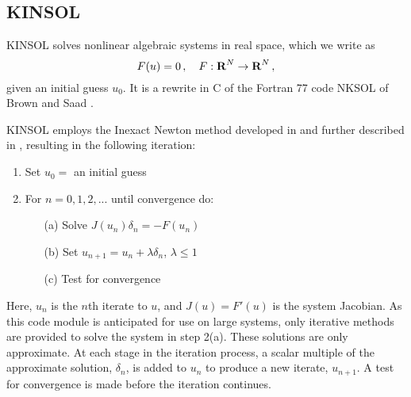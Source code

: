 \subsection{KINSOL}\label{ss:kinsol}

KINSOL solves nonlinear algebraic systems in real space, which we write as
\begin{equation}\label{nonlinear_system}
  F(u) = 0 \, , \quad F:\mbox{\bf R}^N \rightarrow \mbox{\bf R}^N \, ,
\end{equation}
given an initial guess $u_0$.  It is a rewrite in C of the Fortran 77
code NKSOL of Brown and Saad \cite{BrSa:90}.

KINSOL employs the Inexact Newton method developed in
\cite{BrSa:90,Bro:87,DES:82}
and further described in \cite{DeSc:96,Kel:95},
resulting in the following iteration:

\vspace{1ex}
\begin{enumerate}
   \item Set $u_0 = $ an initial guess
   \item For $n = 0, 1, 2,...$ until convergence do:
      \begin{itemize}
          \item[(a)] Solve $J(u_n)\delta_n = - F(u_n)$
          \item[(b)] Set $u_{n+1} = u_n + \lambda \delta_n$,
          $\lambda \leq 1$
          \item[(c)] Test for convergence
      \end{itemize}
\end{enumerate}
Here, $u_n$ is the $n$th iterate to $u$, and $J(u) = F'(u)$ is the
system Jacobian. As this code module is anticipated for use on
large systems, only iterative methods are provided to solve the
system in step 2(a). These solutions are only approximate.  At
each stage in the iteration process, a scalar multiple of the
approximate solution, $\delta_n$, is added to $u_n$ to produce a
new iterate, $u_{n+1}$. A test for convergence is made before the
iteration continues.

